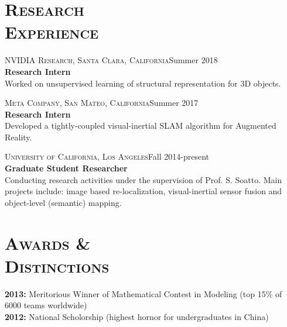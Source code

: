 \documentclass[margin, line, 10pt]{res} %
\begin{document}
\begin{resume}

\section{\textsc{Research\\Experience}}
\textsc{NVIDIA Research, Santa Clara, California}\hfill Summer 2018\\
\textbf{Research Intern}\\
Worked on unsupervised learning of structural representation for 3D objects.

\textsc{Meta Company, San Mateo, California}\hfill Summer 2017\\
\textbf{Research Intern}\\
Developed a tightly-coupled visual-inertial SLAM algorithm for Augmented Reality.

\textsc{University of California, Los Angeles}\hfill Fall 2014-present\\
\textbf{Graduate Student Researcher}\\
Conducting research activities under the supervision of Prof. S. Soatto. Main projects include: image based re-localization, visual-inertial sensor fusion and object-level (semantic) mapping.


\section{\textsc{Awards \&\\Distinctions}}
\textbf{2013:} Meritorious Winner of Mathematical Contest in Modeling (top 15\% of 6000 teams worldwide)\\
\textbf{2012:} National Scholorship (highest hornor for undergraduates in China)

\end{resume}
\end{document}
